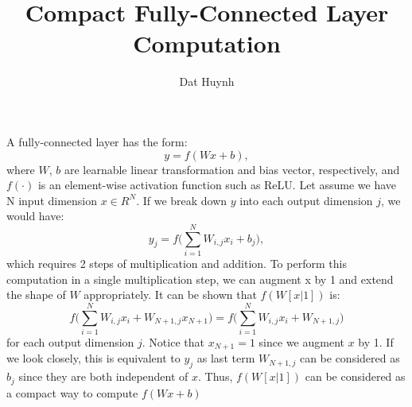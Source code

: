 \documentclass[11pt]{article} %
\title{Compact Fully-Connected Layer Computation}
\author{Dat Huynh}
\begin{document}
\maketitle

A fully-connected layer has the form: 
\begin{equation}
y = f(Wx+b), 
\end{equation}
where $W$, $b$ are learnable linear transformation and bias vector, respectively, and $f(\cdot)$ is an element-wise activation function such as ReLU. 
Let assume we have N input dimension $x\in R^N$. If we break down $y$ into each output dimension $j$, we would have:
\begin{equation}
y_j = f\Big(\sum^{N}_{i=1}W_{i,j} x_i + b_j\Big),
\end{equation}
which requires 2 steps of multiplication and addition.
To perform this computation in a single multiplication step, we can augment x by 1 and extend the shape of $W$ appropriately. 
It can be shown that $f(W[x|1])$ is:
\begin{equation} 
f\Big(\sum^{N}_{i=1}W_{i,j} x_i + W_{N+1,j}x_{N+1}\Big) = f\Big(\sum^{N}_{i=1}W_{i,j} x_i + W_{N+1,j}\Big)
\end{equation}
for each output dimension $j$. Notice that $x_{N+1}=1$ since we augment $x$ by 1.
If we look closely, this is equivalent to $y_j$ as last term $W_{N+1,j}$ can be considered as $b_j$ since they are both independent of $x$. Thus, $f(W[x|1])$ can be considered as a compact way to compute $f(Wx+b)$
\end{document}
